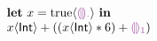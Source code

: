 

\newcommand{\THole}{\ensuremath{\SyEHole{\cdot}}}
\newcommand{\TInt}{\ensuremath{\SyTInt}}

\newcommand{\ELet}[2]{\ensuremath{\SyLet #1 = #2}}
\newcommand{\ELetAnn}[3]{\ensuremath{\SyLet #1 \SyColon #2 = #3}}
\newcommand{\EInn}{\ensuremath{\SyInn}}
\newcommand{\EIn}[1]{\ensuremath{\SyIn #1}}
\newcommand{\EPlus}[2]{\ensuremath{#1 \SyPlus #2}}
\newcommand{\ETimes}[2]{\ensuremath{#1 \SyTimes #2}}
\newcommand{\ECast}[2]{\ensuremath{#1 \SyCastL #2 \SyCastR}}

\newcommand{\ETrue}{\ensuremath{\SyTrue}}
\newcommand{\EEHole}[1]{\ensuremath{\SyEHole{#1}}}


  \[\begin{array}{l}
    \ELet{x}{\ECast{\ETrue}{\THole}} \EInn \\
    \EPlus{\ECast{x}{\TInt}}{(\EPlus{(\ETimes{\ECast{x}{\TInt}}{6})}{\EEHole{1}})}
  \end{array}\]

